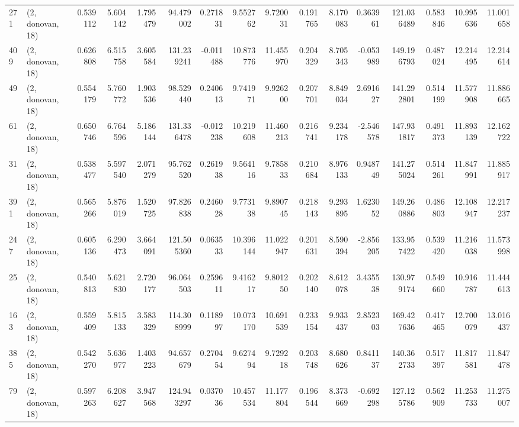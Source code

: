 \begin{tabular}{llrrrrrrrrrrrrrr}
271 &  (2, donovan, 18) &   0.539112 &   5.604142 &   1.795479 &    94.479002 &   0.271831 &   9.552762 &   9.720031 &  0.191765 &   8.170083 &   0.363961 &   121.036489 &  0.583846 &  10.995636 &  11.001658 \\
409 &  (2, donovan, 18) &   0.626808 &   6.515758 &   3.605584 &   131.239241 &  -0.011488 &  10.873776 &  11.455970 &  0.204329 &   8.705343 &  -0.053989 &   149.196793 &  0.487024 &  12.214495 &  12.214614 \\
49  &  (2, donovan, 18) &   0.554179 &   5.760772 &   1.903536 &    98.529440 &   0.240613 &   9.741971 &   9.926200 &  0.207701 &   8.849034 &   2.691627 &   141.292801 &  0.514199 &  11.577908 &  11.886665 \\
61  &  (2, donovan, 18) &   0.650746 &   6.764596 &   5.186144 &   131.336478 &  -0.012238 &  10.219608 &  11.460213 &  0.216741 &   9.234178 &  -2.546578 &   147.931817 &  0.491373 &  11.893139 &  12.162722 \\
31  &  (2, donovan, 18) &   0.538477 &   5.597540 &   2.071279 &    95.762520 &   0.261938 &   9.564116 &   9.785833 &  0.210684 &   8.976133 &   0.948749 &   141.275024 &  0.514261 &  11.847991 &  11.885917 \\
391 &  (2, donovan, 18) &   0.565266 &   5.876019 &   1.520725 &    97.826838 &   0.246028 &   9.773138 &   9.890745 &  0.218143 &   9.293895 &   1.623052 &   149.260886 &  0.486803 &  12.108947 &  12.217237 \\
247 &  (2, donovan, 18) &   0.605136 &   6.290473 &   3.664091 &   121.505360 &   0.063533 &  10.396144 &  11.022947 &  0.201631 &   8.590394 &  -2.856205 &   133.957422 &  0.539420 &  11.216038 &  11.573998 \\
25  &  (2, donovan, 18) &   0.540813 &   5.621830 &   2.720177 &    96.064503 &   0.259611 &   9.416217 &   9.801250 &  0.202140 &   8.612078 &   3.435538 &   130.979174 &  0.549660 &  10.916787 &  11.444613 \\
163 &  (2, donovan, 18) &   0.559409 &   5.815133 &   3.583329 &   114.308999 &   0.118997 &  10.073170 &  10.691539 &  0.233154 &   9.933437 &   2.852303 &   169.427636 &  0.417465 &  12.700079 &  13.016437 \\
385 &  (2, donovan, 18) &   0.542270 &   5.636977 &   1.403223 &    94.657679 &   0.270454 &   9.627494 &   9.729218 &  0.203748 &   8.680626 &   0.841137 &   140.362733 &  0.517397 &  11.817581 &  11.847478 \\
79  &  (2, donovan, 18) &   0.597263 &   6.208627 &   3.947568 &   124.943297 &   0.037036 &  10.457534 &  11.177804 &  0.196544 &   8.373669 &  -0.692298 &   127.125786 &  0.562909 &  11.253733 &  11.275007 \\

\end{tabular}
